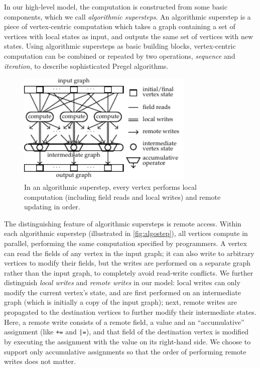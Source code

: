 \documentclass{sokendai_thesis} %
\begin{document}
In our high-level model, the computation is constructed from some basic components, which we call \emph{algorithmic supersteps}.
An algorithmic superstep is a piece of vertex-centric computation which takes a graph containing a set of vertices with local states
as input, and outputs the same set of vertices with new states.
Using algorithmic supersteps as basic building blocks, vertex-centric computation can be combined or repeated by two operations, \emph{sequence} and \emph{iteration}, to describe sophisticated Pregel algorithms.

\begin{figure}[t]
 \centering
 \includegraphics[width=0.75\textwidth]{figures/model.pdf}
 \caption{In an algorithmic superstep, every vertex performs local computation (including field reads and local writes) and remote updating in order.}
 \label{fig:algostep}
 \vspace{-2.5ex}
\end{figure}

The distinguishing feature of algorithmic supersteps is remote access.
Within each algorithmic superstep (illustrated in \autoref{fig:algostep}), all vertices compute in parallel, performing the same computation specified by programmers.
A vertex can read the fields of any vertex in the input graph; it can also write to arbitrary vertices to modify their fields, but the writes are performed on a separate graph rather than the input graph, to completely avoid read-write conflicts.
We further distinguish \emph{local writes} and \emph{remote writes} in our model:
local writes can only modify the current vertex's state, and are first performed on an intermediate graph (which is initially a copy of the input graph);
next, remote writes are propagated to the destination vertices to further modify their intermediate states.
Here, a remote write consists of a remote field, a value and an ``accumulative'' assignment (like \texttt{+=} and \texttt{|=}), and that field of the destination vertex is modified by executing the assignment with the value on its right-hand side.
We choose to support only accumulative assignments so that the order of performing remote writes does not matter.
\end{document}
